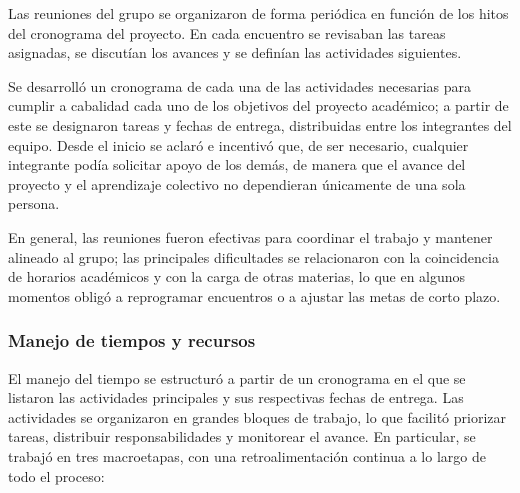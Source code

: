 \documentclass[11pt,a4paper]{article}
\begin{document}
Las reuniones del grupo se organizaron de forma periódica en función de los hitos del cronograma
del proyecto. En cada encuentro se revisaban las tareas asignadas, se discutían los avances y se
definían las actividades siguientes. 

Se desarrolló un cronograma de cada una de las actividades necesarias para cumplir a cabalidad
cada uno de los objetivos del proyecto académico; a partir de este se designaron tareas y fechas
de entrega, distribuidas entre los integrantes del equipo. Desde el inicio se aclaró e incentivó
que, de ser necesario, cualquier integrante podía solicitar apoyo de los demás, de manera que el
avance del proyecto y el aprendizaje colectivo no dependieran únicamente de una sola persona.

En general, las reuniones fueron efectivas para coordinar el trabajo y mantener alineado al grupo;
las principales dificultades se relacionaron con la coincidencia de horarios académicos y con la
carga de otras materias, lo que en algunos momentos obligó a reprogramar encuentros o a ajustar
las metas de corto plazo.

\subsubsection*{Manejo de tiempos y recursos}

El manejo del tiempo se estructuró a partir de un cronograma en el que se listaron las actividades
principales y sus respectivas fechas de entrega. Las actividades se organizaron en grandes bloques
de trabajo, lo que facilitó priorizar tareas, distribuir responsabilidades y monitorear el avance.
En particular, se trabajó en tres macroetapas, con una retroalimentación continua a lo largo de
todo el proceso:
\end{document}
